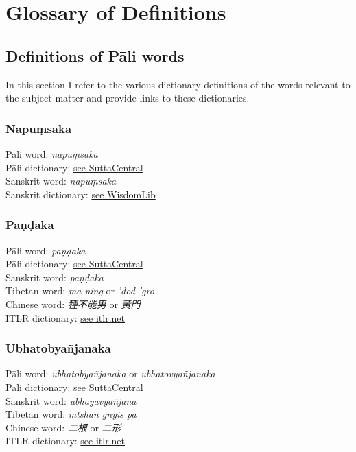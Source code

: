 \section{Glossary of Definitions}
\label{appendix3}

\subsection{Definitions of Pāli words}
In this section I refer to the various dictionary definitions of the words relevant to the subject matter and provide links to these dictionaries.

\subsubsection{Napuṃsaka}
Pāli word: {\em napuṃsaka} \\
Pāli dictionary: \href{https://suttacentral.net/define/napu%E1%B9%83saka}{see SuttaCentral} \\
Sanskrit word: {\em napuṃsaka} \\
Sanskrit dictionary: \href{https://www.wisdomlib.org/definition/napumsaka}{see WisdomLib} \\

\subsubsection{Paṇḍaka}
Pāli word: {\em paṇḍaka} \\
Pāli dictionary: \href{https://suttacentral.net/define/pa%E1%B9%87%E1%B8%8Daka}{see SuttaCentral} \\
Sanskrit word: {\em paṇḍaka} \\
Tibetan word: {\em ma ning} or {\em ’dod ’gro} \\
Chinese word: {\em 種不能男} or {\em 黃門}\\
ITLR dictionary: \href{http://www.itlr.net/hwid:281142}{see itlr.net} \\

\subsubsection{Ubhatob­yañ­janaka}
Pāli word: {\em ubhatob­yañ­janaka} or {\em ubhatovyañ­janaka} \\
Pāli dictionary: \href{https://suttacentral.net/define/ubhatovya%C3%B1janaka}{see SuttaCentral} \\
Sanskrit word: {\em ubhayavyañjana} \\
Tibetan word: {\em mtshan gnyis pa} \\
Chinese word: {\em 二根} or {\em 二形}\\
ITLR dictionary: \href{http://www.itlr.net/hwid:62844}{see itlr.net} \\

